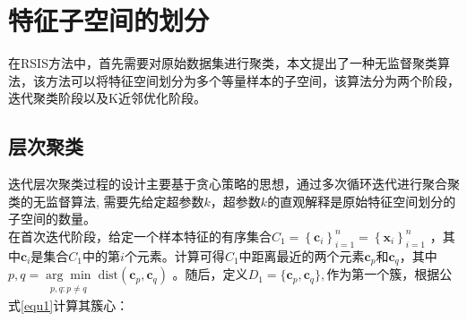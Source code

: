 \documentclass{NauThesis}
\begin{document}
\section{特征子空间的划分}
在RSIS方法中，首先需要对原始数据集进行聚类，本文提出了一种无监督聚类算法，该方法可以将特征空间划分为多个等量样本的子空间，该算法分为两个阶段，迭代聚类阶段以及K近邻优化阶段。
\subsection{层次聚类}
迭代层次聚类过程的设计主要基于贪心策略的思想，通过多次循环迭代进行聚合聚类的无监督算法, 需要先给定超参数$k$，超参数$k$的直观解释是原始特征空间划分的子空间的数量。
\\\hspace*{2em}在首次迭代阶段，给定一个样本特征的有序集合$C_1=\left\{\boldsymbol{c}_i \right\}_{i=1}^n=\left\{\boldsymbol{x}_i \right\}_{i=1}^n$
，其中$\boldsymbol{c}_i$是集合$C_1$中的第$i$个元素。计算可得$C_1$中距离最近的两个元素$\boldsymbol{c}_p$和$\boldsymbol{c}_q$，其中
$p,q = \underset{\substack{p, q: p \neq q}}{\arg\min} \;\text{dist}(\boldsymbol{c}_p, \boldsymbol{c}_q)$
。随后，定义$D_{1}=\{\boldsymbol{c}_p,\boldsymbol{c}_q\},$作为第一个簇，根据公式\eqref{equ1}计算其簇心：
\end{document}

